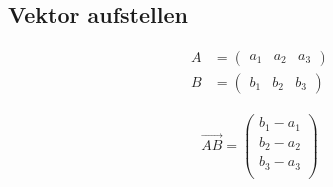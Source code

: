 \documentclass[german]{latex4ei/latex4ei_sheet}
\begin{document}
\begin{sectionbox}

\subsection{Vektor aufstellen}

\begin{minipage}{0.49\textwidth}
\begin{align*}
 A &= \begin{pmatrix} {a}_{1} & {a}_{2} & {a}_{3} \end{pmatrix}  \\ 
 B &= \begin{pmatrix} {b}_{1} & {b}_{2} & {b}_{3} \end{pmatrix}
\end{align*}

\end{minipage}
\begin{minipage}{0.49\textwidth}
\begin{align*}
\overrightarrow{AB} = \begin{pmatrix}
{b}_{1} - {a}_{1} \\
{b}_{2} - {a}_{2} \\
{b}_{3} - {a}_{3} \\
\end{pmatrix}
\end{align*}
\end{minipage}


\end{sectionbox}
\end{document}
